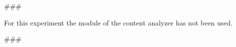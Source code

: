 
\usepackage{comment}


###

For this experiment the module of the content analyzer has not been used.
\hfill\break
\hfill\break


###



\begin{comment}
Author = DIEGO MICCOLI
Alias = Kozen88
Organization = SWAP Research Group UniBa
Date = 27-12-2023

This mini template is not working by itself because there are latex command missing needed
to compile the file and give as output a pdf file, in addition it has been added jinja
statement in order to control the rendering of the latex file with the jinja library, for these
reasons it needs to be used with the other mini chunks in conjunction.
\end{comment}